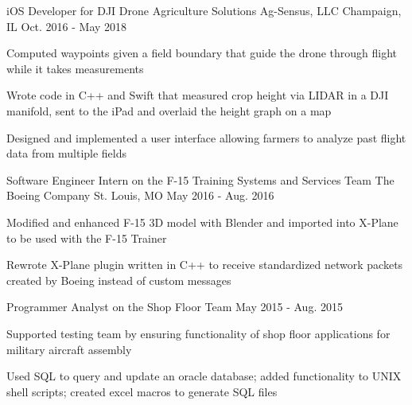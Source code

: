 \begin{cventries}
  \cventry
    {iOS Developer for DJI Drone Agriculture Solutions} %
    {Ag-Sensus, LLC} %
    {Champaign, IL} %
    {Oct. 2016 - May 2018} %
    {
      \begin{cvitems} %
        \item {Computed waypoints given a field boundary that guide the drone through flight while it takes measurements}
        \item {Wrote code in C++ and Swift that measured crop height via LIDAR in a DJI manifold, sent to the iPad and overlaid the height graph on a map}
        \item {Designed and implemented a user interface allowing farmers to analyze past flight data from multiple fields}
      \end{cvitems}
    }

  \cventry
    {Software Engineer Intern on the F-15 Training Systems and Services Team} %
    {The Boeing Company} %
    {St. Louis, MO} %
    {May 2016 - Aug. 2016} %
    {
      \begin{cvitems} %
        \item {Modified and enhanced F-15 3D model with Blender and imported into X-Plane to be used with the F-15 Trainer}
        \item {Rewrote X-Plane plugin written in C++ to receive standardized network packets created by Boeing instead of custom messages}
      \end{cvitems}
    }

  \cventry
    {Programmer Analyst on the Shop Floor Team} %
    {} %
    {} %
    {May 2015 - Aug. 2015} %
    {
      \begin{cvitems} %
        \item {Supported testing team by ensuring functionality of shop floor applications for military aircraft assembly}
        \item {Used SQL to query and update an oracle database; added functionality to UNIX shell scripts; created excel macros to generate SQL files}
      \end{cvitems}
    }

\end{cventries}

